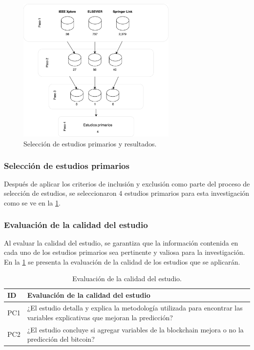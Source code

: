 \begin{figure}[H]
	\centering
	\includegraphics[width=0.7\textwidth]{Chapter2/SelecEstudiPrim_2.png}
	\caption{Selección de estudios primarios y resultados.}
	\label{fig2}
\end{figure}
\vspace{-0.8cm}
\subsubsection{Selección de estudios primarios}
Después de aplicar los criterios de inclusión y exclusión como parte del proceso de selección de estudios, se seleccionaron 4 estudios primarios para esta investigación como se ve en la \cref{fig2}.\\
\vspace{-1cm}
\subsubsection{Evaluación de la calidad del estudio}
Al evaluar la calidad del estudio, se garantiza que la información contenida en cada uno de los estudios primarios sea pertinente y valiosa para la investigación. En la \cref{tab:Table5} se presenta la evaluación de la calidad de los estudios que se aplicarán.

\begin{table}[H]
	\centering
	\begin{tabular}{ | m{2cm}| m{12cm} | }
		\hline
		\textbf{ID} & \textbf{Evaluación de la calidad del estudio}\\
		\hline
		PC1 & ¿El estudio detalla y explica la metodología utilizada para encontrar las variables explicativas que mejoran la predicción?\\
		\hline
		PC2 & ¿El estudio concluye si agregar variables de la blockchain mejora o no la predicción del bitcoin?\\
		\hline
	\end{tabular}
	\caption{Evaluación de la calidad del estudio.}
	\label{tab:Table5}
\end{table}

